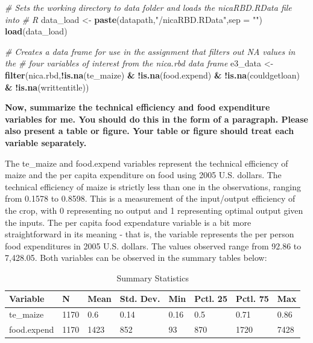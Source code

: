 \documentclass[
]{article}
\newenvironment{Shaded}{\begin{snugshade}}{\end{snugshade}}
\newcommand{\AttributeTok}[1]{\textcolor[rgb]{0.13,0.29,0.53}{#1}}
\newcommand{\CommentTok}[1]{\textcolor[rgb]{0.56,0.35,0.01}{\textit{#1}}}
\newcommand{\FunctionTok}[1]{\textcolor[rgb]{0.13,0.29,0.53}{\textbf{#1}}}
\newcommand{\NormalTok}[1]{#1}
\newcommand{\OtherTok}[1]{\textcolor[rgb]{0.56,0.35,0.01}{#1}}
\newcommand{\SpecialCharTok}[1]{\textcolor[rgb]{0.81,0.36,0.00}{\textbf{#1}}}
\newcommand{\StringTok}[1]{\textcolor[rgb]{0.31,0.60,0.02}{#1}}
\begin{document}
\begin{Shaded}
\begin{Highlighting}[]
\CommentTok{\# Sets the working directory to data folder and loads the nicaRBD.RData file into}
\CommentTok{\# R}
\NormalTok{data\_load }\OtherTok{\textless{}{-}} \FunctionTok{paste}\NormalTok{(datapath,}\StringTok{"/nicaRBD.RData"}\NormalTok{,}\AttributeTok{sep =} \StringTok{""}\NormalTok{)}
\FunctionTok{load}\NormalTok{(data\_load)}

\CommentTok{\# Creates a data frame for use in the assignment that filters out NA values in the}
\CommentTok{\# four variables of interest from the nica.rbd data frame}
\NormalTok{e3\_data }\OtherTok{\textless{}{-}} \FunctionTok{filter}\NormalTok{(nica.rbd,}\SpecialCharTok{!}\FunctionTok{is.na}\NormalTok{(te\_maize) }\SpecialCharTok{\&} \SpecialCharTok{!}\FunctionTok{is.na}\NormalTok{(food.expend) }\SpecialCharTok{\&} \SpecialCharTok{!}\FunctionTok{is.na}\NormalTok{(couldgetloan) }\SpecialCharTok{\&} \SpecialCharTok{!}\FunctionTok{is.na}\NormalTok{(writtentitle))}
\end{Highlighting}
\end{Shaded}

\hfill\break

\hfill\break

\hfill\break

\textbf{Now, summarize the technical efficiency and food expenditure
variables for me. You should do this in the form of a paragraph. Please
also present a table or figure. Your table or figure should treat each
variable separately.}

\hfill\break
The te\_maize and food.expend variables represent the technical
efficiency of maize and the per capita expenditure on food using 2005
U.S. dollars. The technical efficiency of maize is strictly less than
one in the observations, ranging from 0.1578 to 0.8598. This is a
measurement of the input/output efficiency of the crop, with 0
representing no output and 1 representing optimal output given the
inputs. The per capita food expendature variable is a bit more
straightforward in its meaning - that is, the variable represents the
per person food expenditures in 2005 U.S. dollars. The values observed
range from 92.86 to 7,428.05. Both variables can be observed in the
summary tables below:\\

\begin{table}

\caption{\label{tab:unnamed-chunk-3}Summary Statistics}
\centering
\begin{tabular}[t]{llllllll}
\toprule
Variable & N & Mean & Std. Dev. & Min & Pctl. 25 & Pctl. 75 & Max\\
\midrule
te_maize & 1170 & 0.6 & 0.14 & 0.16 & 0.5 & 0.71 & 0.86\\
food.expend & 1170 & 1423 & 852 & 93 & 870 & 1720 & 7428\\
\bottomrule
\end{tabular}
\end{table}
\end{document}
